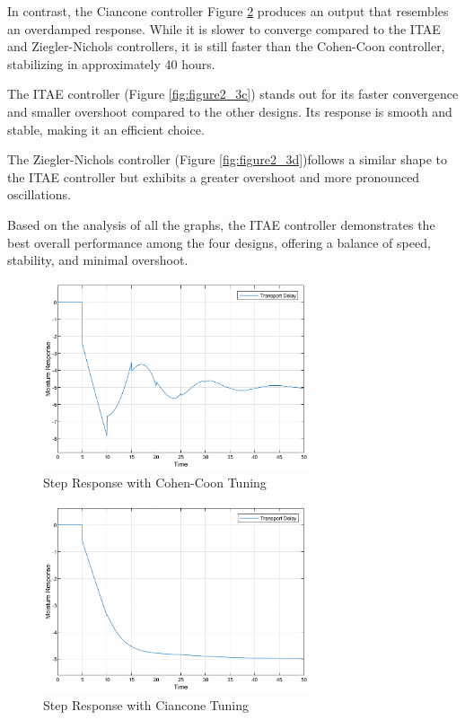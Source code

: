 \documentclass[12pt]{article}
\begin{document}
\begin{enumerate}
\begin{enumerate}
    In contrast, the Ciancone controller Figure \ref{fig:figure2_3b} produces an output that resembles an overdamped response. While it is slower to converge compared to the ITAE and Ziegler-Nichols controllers, it is still faster than the Cohen-Coon controller, stabilizing in approximately 40 hours.

    The ITAE controller (Figure \ref{fig:figure2_3c}) stands out for its faster convergence and smaller overshoot compared to the other designs. Its response is smooth and stable, making it an efficient choice. 
    
    The Ziegler-Nichols controller (Figure \ref{fig:figure2_3d})follows a similar shape to the ITAE controller but exhibits a greater overshoot and more pronounced oscillations.

    Based on the analysis of all the graphs, the ITAE controller demonstrates the best overall performance among the four designs, offering a balance of speed, stability, and minimal overshoot.

    \begin{figure}[H]
      \centering
      \includegraphics[width=0.7\textwidth]{Figures/figure2-3a.png}
      \caption{Step Response with Cohen-Coon Tuning}
      \label{fig:figure2_3a}
    \end{figure}

    \begin{figure}[H]
      \centering
      \includegraphics[width=0.7\textwidth]{Figures/figure2-3b.png}
      \caption{Step Response with Ciancone Tuning}
      \label{fig:figure2_3b}
    \end{figure}


\end{enumerate}
\end{enumerate}
\end{document}
